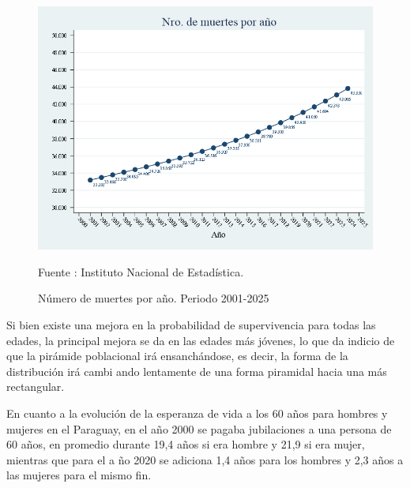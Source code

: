 \begin{figure}[H]
\begin{center}
                    \caption{Número de muertes por año. Periodo 2001-2025}
                    \includegraphics[scale=0.45]{INE_indic_nromuertesanual.png}
                                    \item \footnotesize Fuente : Instituto Nacional de Estadística.
                    \end{center}
\end{figure}

Si bien existe una mejora en la probabilidad de supervivencia para todas
las edades, la principal mejora se da en las edades más jóvenes, lo que
da indicio de que la pirámide poblacional irá ensanchándose, es decir,
la forma de la distribución irá cambi ando lentamente de una forma
piramidal hacia una más rectangular.

En cuanto a la evolución de la esperanza de vida a los 60 años para
hombres y mujeres en el Paraguay, en el año 2000 se pagaba jubilaciones
a una persona de 60 años, en promedio durante 19,4 años si era hombre y
21,9 si era mujer, mientras que para el a ño 2020 se adiciona 1,4 años
para los hombres y 2,3 años a las mujeres para el mismo fin.

